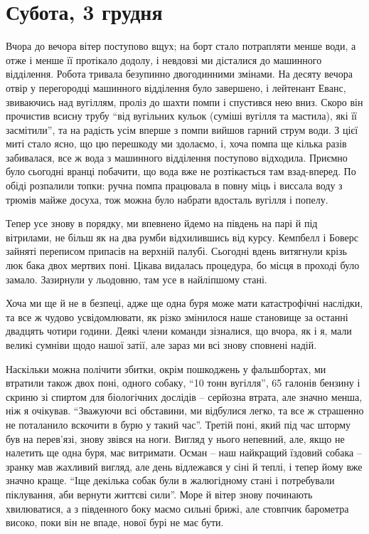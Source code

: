  
 
 
 
 
\section{Субота, 3 грудня}

Вчора до вечора вітер поступово вщух; на борт стало потрапляти менше води, а
отже і менше її протікало додолу, і невдовзі ми дісталися до машинного
відділення. Робота тривала безупинно двогодинними змінами. На десяту вечора
отвір у перегородці машинного відділення було завершено, і лейтенант Еванс,
звиваючись над вугіллям, проліз до шахти помпи і спустився нею вниз. Скоро він
прочистив всисну трубу \enquote{від вугільних кульок (суміші вугілля та
мастила), які її засмітили}, та на радість усім вперше з помпи вийшов гарний
струм води. З цієї миті стало ясно, що цю перешкоду ми здолаємо, і, хоча помпа
ще кілька разів забивалася, все ж вода з машинного відділення поступово
відходила.  Приємно було сьогодні вранці побачити, що вода вже не розтікається
там взад-вперед. По обіді розпалили топки: ручна помпа працювала в повну міць і
виссала воду з трюмів майже досуха, тож можна було набрати вдосталь вугілля і
попелу.

Тепер усе знову в порядку, ми впевнено йдемо на південь на парі й під
вітрилами, не більш як на два румби відхилившись від курсу. Кемпбелл і Боверс
зайняті переписом припасів на верхній палубі. Сьогодні вдень витягнули крізь
люк бака двох мертвих поні. Цікава видалась процедура, бо місця в проході було
замало. Зазирнули у льодовню, там усе в найліпшому стані.

Хоча ми ще й не в безпеці, адже ще одна буря може мати катастрофічні наслідки,
та все ж чудово усвідомлювати, як різко змінилося наше становище за останні
двадцять чотири години. Деякі члени команди зізналися, що вчора, як і я, мали
великі сумніви щодо нашої затії, але зараз ми всі знову сповнені надій.

Наскільки можна полічити збитки, окрім пошкоджень у фальшбортах, ми втратили
також двох поні, одного собаку, \enquote{10 тонн вугілля}, 65 галонів бензину і скриню
зі спиртом для біологічних дослідів – серйозна втрата, але значно менша, ніж я
очікував. \enquote{Зважуючи всі обставини, ми відбулися легко, та все ж страшенно не
поталанило вскочити в бурю у такий час}. Третій поні, який під час шторму був
на перев’язі, знову звівся на ноги. Вигляд у нього непевний, але, якщо не
налетить ще одна буря, має витримати. Осман – наш найкращий їздовий собака –
зранку мав жахливий вигляд, але день відлежався у сіні й теплі, і тепер йому
вже значно краще. \enquote{Іще декілька собак були в жалюгідному стані і потребували
піклування, аби вернути життєві сили}. Море й вітер знову починають
хвилюватися, а з південного боку маємо сильні брижі, але стовпчик барометра
високо, поки він не впаде, нової бурі не має бути.

